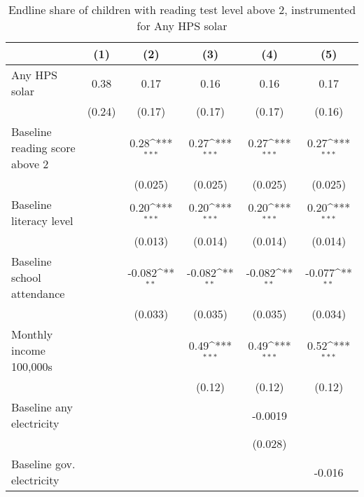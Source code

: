 \begin{table}[htbp]\centering
\def\sym#1{\ifmmode^{#1}\else\(^{#1}\)\fi}
\caption{Endline share of children with reading test level above 2, instrumented for Any HPS solar}
\begin{tabular*}{1\hsize}{@{\hskip\tabcolsep\extracolsep\fill}l*{5}{c}}
\toprule
                &\multicolumn{1}{c}{(1)}         &\multicolumn{1}{c}{(2)}         &\multicolumn{1}{c}{(3)}         &\multicolumn{1}{c}{(4)}         &\multicolumn{1}{c}{(5)}         \\
\midrule
Any HPS solar   &     0.38         &     0.17         &     0.16         &     0.16         &     0.17         \\
                &   (0.24)         &   (0.17)         &   (0.17)         &   (0.17)         &   (0.16)         \\
Baseline reading score above 2&                  &     0.28\sym{***}&     0.27\sym{***}&     0.27\sym{***}&     0.27\sym{***}\\
                &                  &  (0.025)         &  (0.025)         &  (0.025)         &  (0.025)         \\
Baseline literacy level&                  &     0.20\sym{***}&     0.20\sym{***}&     0.20\sym{***}&     0.20\sym{***}\\
                &                  &  (0.013)         &  (0.014)         &  (0.014)         &  (0.014)         \\
Baseline school attendance&                  &   -0.082\sym{**} &   -0.082\sym{**} &   -0.082\sym{**} &   -0.077\sym{**} \\
                &                  &  (0.033)         &  (0.035)         &  (0.035)         &  (0.034)         \\
Monthly income 100,000s&                  &                  &     0.49\sym{***}&     0.49\sym{***}&     0.52\sym{***}\\
                &                  &                  &   (0.12)         &   (0.12)         &   (0.12)         \\
Baseline any electricity&                  &                  &                  &  -0.0019         &                  \\
                &                  &                  &                  &  (0.028)         &                  \\
Baseline gov. electricity&                  &                  &                  &                  &   -0.016         \\

\end{tabular*}
\end{table}
